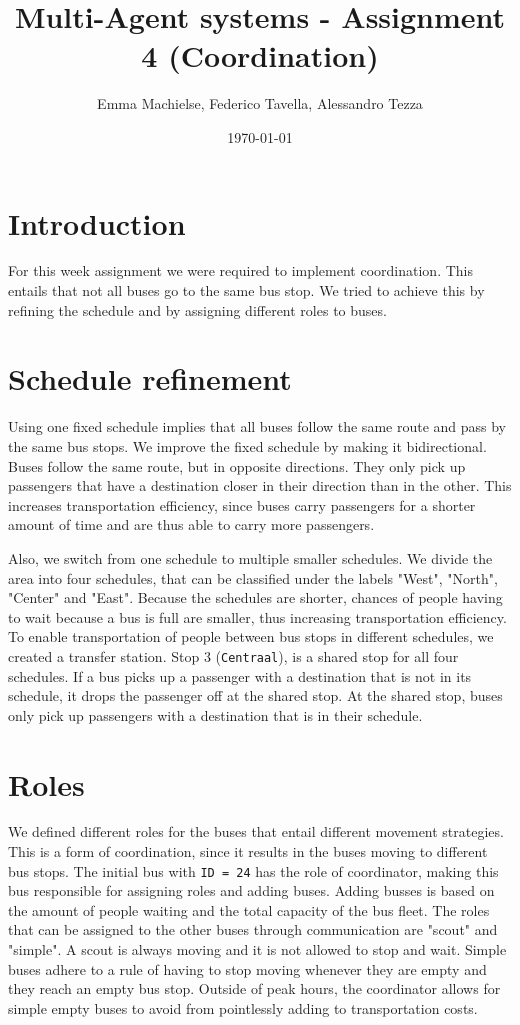 \documentclass[a4paper]{article}
\title{Multi-Agent systems - Assignment 4 (Coordination)}
\author{Emma Machielse, Federico Tavella, Alessandro Tezza}
\date{\today}
\begin{document}
\maketitle

\section{Introduction}
For this week assignment we were required to implement coordination. This entails that not all buses go to the same bus stop. We tried to achieve this by refining the schedule and by assigning different roles to buses. 

\section{Schedule refinement}

Using one fixed schedule implies that all buses follow the same route and pass by the same bus stops. We improve the fixed schedule by making it bidirectional. Buses follow the same route, but in opposite directions. They only pick up passengers that have a destination closer in their direction than in the other. This increases transportation efficiency, since buses carry passengers for a shorter amount of time and are thus able to carry more passengers. 

Also, we switch from one schedule to multiple smaller schedules. We divide the area into four schedules, that can be classified under the labels "West", "North", "Center" and "East". Because the schedules are shorter, chances of people having to wait because a bus is full are smaller, thus increasing transportation efficiency. To enable transportation of people between bus stops in different schedules, we created a transfer station. Stop 3 (\texttt{Centraal}), is a shared stop for all four schedules. If a bus picks up a passenger with a destination that is not in its schedule, it drops the passenger off at the shared stop. At the shared stop, buses only pick up passengers with a destination that is in their schedule. 

\section{Roles}

We defined different roles for the buses that entail different movement strategies. This is a form of coordination, since it results in the buses moving to different bus stops. The initial bus with \texttt{ID = 24} has the role of coordinator, making this bus responsible for assigning roles and adding buses. Adding busses is based on the amount of people waiting and the total capacity of the bus fleet. The roles that can be assigned to the other buses through communication are "scout" and "simple". A scout is always moving and it is not allowed to stop and wait. Simple buses adhere to a rule of having to stop moving whenever they are empty and they reach an empty bus stop. Outside of peak hours, the coordinator allows for simple empty buses to avoid from pointlessly adding to transportation costs.  
\end{document}
